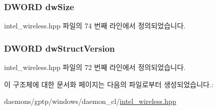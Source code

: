 \subsubsection[{\texorpdfstring{dw\+Size}{dwSize}}]{\setlength{\rightskip}{0pt plus 5cm}D\+W\+O\+RD dw\+Size}\hypertarget{struct___i_n_t_e_l___w_i_f_i___h_e_a_d_e_r_a669c5a85f5a9eb97e64ad880fadaaa2d}{}\label{struct___i_n_t_e_l___w_i_f_i___h_e_a_d_e_r_a669c5a85f5a9eb97e64ad880fadaaa2d}


intel\+\_\+wireless.\+hpp 파일의 74 번째 라인에서 정의되었습니다.

\subsubsection[{\texorpdfstring{dw\+Struct\+Version}{dwStructVersion}}]{\setlength{\rightskip}{0pt plus 5cm}D\+W\+O\+RD dw\+Struct\+Version}\hypertarget{struct___i_n_t_e_l___w_i_f_i___h_e_a_d_e_r_a1955a5d9a8f0620b32d679505ea5b0ae}{}\label{struct___i_n_t_e_l___w_i_f_i___h_e_a_d_e_r_a1955a5d9a8f0620b32d679505ea5b0ae}


intel\+\_\+wireless.\+hpp 파일의 72 번째 라인에서 정의되었습니다.



이 구조체에 대한 문서화 페이지는 다음의 파일로부터 생성되었습니다.\+:\begin{DoxyCompactItemize}
\item 
daemons/gptp/windows/daemon\+\_\+cl/\hyperlink{intel__wireless_8hpp}{intel\+\_\+wireless.\+hpp}\end{DoxyCompactItemize}

